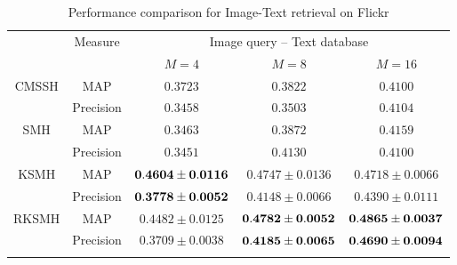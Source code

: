 \begin{table}[htb]\small
\caption{Performance comparison for Image-Text retrieval on \mbox{Flickr}}\label{table:comp-flickr-cross-it}\vspace{-0.5cm}
\begin{center}
\begin{tabular}{|c|c|c|c|c|}
\toprule[1pt]\addlinespace[0pt]
    \multirow{2}{*}{Method}&  \multirow{2}{*}{Measure}  &  \multicolumn{3}{|c|}{Image query -- Text database}  \\
\cline{3-5}%
&&$M=4$&$M=8$&$M=16$\\
\hline
\multirow{2}{*}{CMSSH}&{MAP}    &    $0.3723  $           &  $  0.3822  $ &$  0.4100$  \\
\cline{2-5}%
&{Precision}    &     	$0.3458 $         &     $   0.3503 $         &        $   0.4104$       \\
\hline%
\multirow{2}{*}{SMH}&MAP        &     $0.3463  $         &     $  0.3872  $      &  $  0.4159$ \\
\cline{2-5}%
&{Precision}    &     	$0.3451  $         &   $   0.4130 $            &    $  0.4100$         \\
\hline%
\multirow{2}{*}{KSMH}&MAP        &   ${\bf0.4604 \pm 0.0116}$       &  $   0.4747 \pm  0.0136  $         & $   0.4718\pm    0.0066$\\
\cline{2-5}%
&{Precision}    &     	${\bf 0.3778  \pm0.0052}  $         & $   0.4148  \pm   0.0066  $              &  $ 0.4390\pm  0.0111$ \\
\hline%
\multirow{2}{*}{RKSMH}&MAP        &     $0.4482 \pm 0.0125  $         & $ {\bf  0.4782   \pm  0.0052}  $          & $ {\bf 0.4865\pm   0.0037}  $ \\
\cline{2-5}%
&{Precision}    &    	$0.3709  \pm0.0038 $          &    $ {\bf 0.4185   \pm   0.0065}$           &    $ {\bf 0.4690\pm  0.0094} $\\
\addlinespace[0pt]\bottomrule[1pt]
\end{tabular}
\end{center}
\end{table}

